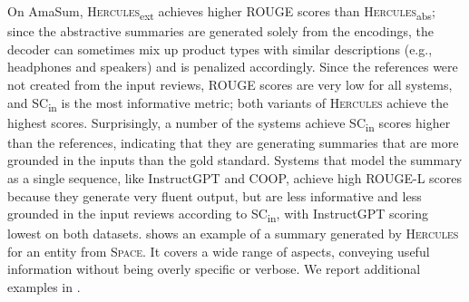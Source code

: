 \documentclass[11pt]{article}
\begin{document}
On AmaSum, \textsc{Hercules}\textsubscript{ext} achieves higher ROUGE scores than \textsc{Hercules}\textsubscript{abs}; since the abstractive summaries are generated solely from the encodings, the decoder can sometimes mix up product types with similar descriptions (e.g., headphones and speakers) and is penalized accordingly. Since the references were not created from the input reviews, ROUGE scores are very low for all systems, and SC\textsubscript{in} is the most informative metric; both variants of \textsc{Hercules} achieve the highest scores. Surprisingly, a number of the systems achieve SC\textsubscript{in} scores higher than the references, indicating that they are generating summaries that are more grounded in the inputs than the gold standard. Systems that model the summary as a single sequence, like InstructGPT and COOP, achieve high ROUGE-L scores because they generate very fluent output, but are less informative and less grounded in the input reviews according to SC\textsubscript{in}, with InstructGPT scoring lowest on both datasets.  shows an example of a summary generated by \textsc{Hercules} for an entity from \textsc{Space}. It covers a wide range of aspects, conveying useful information without being overly specific or verbose. We report additional examples in . 
\end{document}
